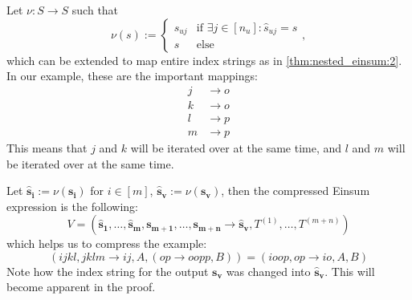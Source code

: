 \begin{theorem}
    Let $\nu: S \rightarrow S$ such that
    $$\nu(s) := \begin{cases}
            s_{uj} & \text{if }\exists j \in [n_u]: \hat{s}_{uj} = s \\
            s      & \text{else}
        \end{cases},$$
    which can be extended to map entire index strings as in \autoref{thm:nested_einsum:2}.
    In our example, these are the important mappings:
    \begin{align*}
        j & \rightarrow o \\
        k & \rightarrow o \\
        l & \rightarrow p \\
        m & \rightarrow p
    \end{align*}
    This means that $j$ and $k$ will be iterated over at the same time, and $l$ and $m$ will be iterated over at the same time.

    Let $\bm{\hat{s}_i} := \nu(\bm{s_i})$ for $i \in [m]$, $\bm{\hat{s}_v} := \nu(\bm{s_v})$, then the compressed Einsum expression is the following:
    $$V = (\bm{\hat{s}_1},\dots,\bm{\hat{s}_m}, \bm{s_{m + 1}}, \dots, \bm{s_{m + n}} \rightarrow \bm{\hat{s}_v}, T^{(1)},\dots,T^{(m + n)})$$
    which helps us to compress the example:
    $$(ijkl, jklm \rightarrow ij, A, (op \rightarrow oopp, B)) = (ioop, op \rightarrow io, A, B)$$
    Note how the index string for the output $\bm{s_v}$ was changed into $\bm{\hat{s}_v}$.
    This will become apparent in the proof.
\end{theorem}

